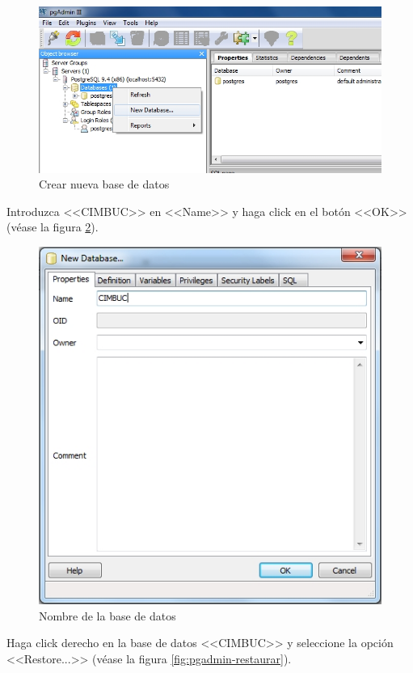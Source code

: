 \begin{figure}[H]
  \centering
  \includegraphics[width=1\linewidth]{./img/pgadmin-bd.jpg}
\caption[Crear nueva base de datos]{Crear nueva base de datos\label{fig:pgadmin-bd}}
\end{figure}

Introduzca <<CIMBUC>> en <<Name>> y haga click en el bot\'{o}n <<OK>> (v\'{e}ase la figura \ref{fig:pgadmin-bd-nombre}).

\begin{figure}[H]
  \centering
  \includegraphics[width=.5\linewidth]{./img/pgadmin-bd-nombre.jpg}
\caption[Nombre de la base de datos]{Nombre de la base de datos\label{fig:pgadmin-bd-nombre}}
\end{figure}

\newpage

Haga click derecho en la base de datos <<CIMBUC>> y seleccione la opci\'{o}n <<Restore...>> (v\'{e}ase la figura \ref{fig:pgadmin-restaurar}).

